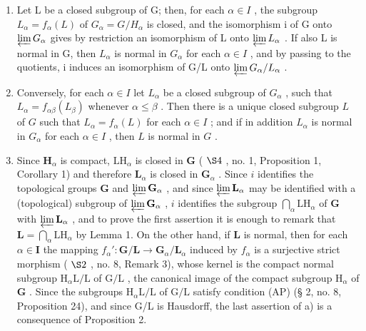 \begin{enumerate}
\def\labelenumi{\alph{enumi})}
\item
  Let L be a closed subgroup of G; then, for each \(\alpha\in I\) , the subgroup \(L_{\alpha}=f_{\alpha}(L)\) of \(G_{\alpha}=G/H_{\alpha}\) is closed, and the isomorphism i of G onto \(\varprojlim G_{\alpha}\) gives by restriction an isomorphism of L onto \(\varprojlim L_{\alpha}\) . If also L is normal in G, then \(L_{\alpha}\) is normal in \(G_{\alpha}\) for each \(\alpha\in I\) , and by passing to the quotients, i induces an isomorphism of G/L onto \(\varprojlim G_{\alpha}/L_{\alpha}\) .
\item
  Conversely, for each \(\alpha \in I\) let \(L_{\alpha}\) be a closed subgroup of \(G_{\alpha}\) , such that \(L_{\alpha} = f_{\alpha \beta}(L_{\beta})\) whenever \(\alpha \leqslant \beta\) . Then there is a unique closed subgroup \(L\) of \(G\) such that \(L_{\alpha} = f_{\alpha}(L)\) for each \(\alpha \in I\) ; and if in addition \(L_{\alpha}\) is normal in \(G_{\alpha}\) for each \(\alpha \in I\) , then \(L\) is normal in \(G\) .
\item
  Since \(\mathbf{H}_{\alpha}\) is compact, \(\mathrm{LH}_{\alpha}\) is closed in \(\mathbf{G}\) ( \(\S 4\) , no. 1, Proposition 1, Corollary 1) and therefore \(\mathbf{L}_{\alpha}\) is closed in \(\mathbf{G}_{\alpha}\) . Since \(i\) identifies the topological groups \(\mathbf{G}\) and \(\varprojlim \mathbf{G}_{\alpha}\) , and since \(\varprojlim \mathbf{L}_{\alpha}\) may be identified with a (topological) subgroup of \(\varprojlim \mathbf{G}_{\alpha}\) , \(i\) identifies the subgroup \(\bigcap_{\alpha} \mathrm{LH}_{\alpha}\) of \(\mathbf{G}\) with \(\varprojlim \mathbf{L}_{\alpha}\) , and to prove the first assertion it is enough to remark that \(\mathbf{L} = \bigcap_{\alpha} \mathrm{LH}_{\alpha}\) by Lemma 1. On the other hand, if \(\mathbf{L}\) is normal, then for each \(\alpha \in \mathbf{I}\) the mapping \(f_{\alpha}': \mathbf{G} / \mathbf{L} \to \mathbf{G}_{\alpha} / \mathbf{L}_{\alpha}\) induced by \(f_{\alpha}\) is a surjective strict morphism ( \(\S 2\) , no. 8, Remark 3), whose kernel is the compact normal subgroup \(\mathrm{H}_{\alpha} \mathrm{L} / \mathrm{L}\) of \(\mathrm{G} / \mathrm{L}\) , the canonical image of the compact subgroup \(\mathrm{H}_{\alpha}\) of \(\mathbf{G}\) . Since the subgroups \(\mathrm{H}_{\alpha} \mathrm{L} / \mathrm{L}\) of \(\mathrm{G} / \mathrm{L}\) satisfy condition (AP) (§ 2, no. 8, Proposition 24), and since G/L is Hausdorff, the last assertion of a) is a consequence of Proposition 2.

\end{enumerate}
